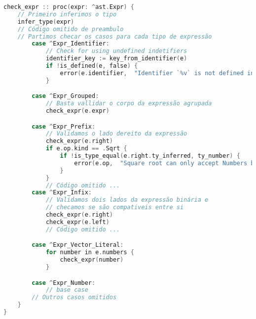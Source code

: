 \begin{codigo}[H]
    \caption{\small Recorte da função \texttt{check\_expr}. }
    \label{eq-function-check-expr}
\begin{lstlisting}[language=C, frame=none, inputencoding=utf8]
check_expr :: proc(expr: ^ast.Expr) {
    // Primeiro inferimos o tipo
    infer_type(expr)
    // Código omitido de preambulo
    // Partimos checar os casos para cada tipo de expressão
        case ^Expr_Identifier:
            // Check for using undefined indetifiers
            identifier_key := key_from_identifier(e)
            if !is_defined(e, false) {
                error(e.identifier,  "Identifier `%v` is not defined in the current scope.", identifier_key)
            }

        case ^Expr_Grouped:
            // Basta vallidar o corpo da expressão agrupada
            check_expr(e.expr)

        case ^Expr_Prefix:
            // Validamos o lado dereito da expressão
            check_expr(e.right)
            if e.op.kind == .Sqrt {
                if !is_type_equal(e.right.ty_inferred, ty_number) {
                    error(e.op,  "Square root can only accept Numbers but instead got `%v`.", format_type(e.right.ty_inferred))
                }
            }
            // Código omitido ...
        case ^Expr_Infix:
            // Validamos dois lados da expressão binária e
            // checamos se são compativeis entre si
            check_expr(e.right)
            check_expr(e.left)
            // Código omitido ...

        case ^Expr_Vector_Literal:
            for number in e.numbers {
                check_expr(number)
            }

        case ^Expr_Number:
            // base case
        // Outros casos omitidos
    }
}

\end{lstlisting}
\end{codigo}

